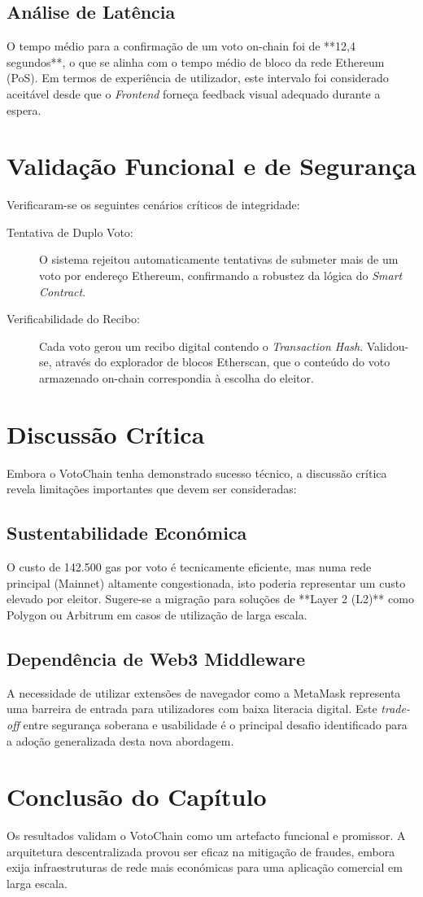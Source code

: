 \subsection{Análise de Latência}
O tempo médio para a confirmação de um voto on-chain foi de **12,4 segundos**, o que se alinha com o tempo médio de bloco da rede Ethereum (PoS). Em termos de experiência de utilizador, este intervalo foi considerado aceitável desde que o \textit{Frontend} forneça feedback visual adequado durante a espera.

\section{Validação Funcional e de Segurança}

Verificaram-se os seguintes cenários críticos de integridade:
\begin{description}
    \item[Tentativa de Duplo Voto:] O sistema rejeitou automaticamente tentativas de submeter mais de um voto por endereço Ethereum, confirmando a robustez da lógica do \textit{Smart Contract}.
    \item[Verificabilidade do Recibo:] Cada voto gerou um recibo digital contendo o \textit{Transaction Hash}. Validou-se, através do explorador de blocos Etherscan, que o conteúdo do voto armazenado on-chain correspondia à escolha do eleitor.
\end{description}

\section{Discussão Crítica}

Embora o VotoChain tenha demonstrado sucesso técnico, a discussão crítica revela limitações importantes que devem ser consideradas:

\subsection{Sustentabilidade Económica}
O custo de 142.500 gas por voto é tecnicamente eficiente, mas numa rede principal (Mainnet) altamente congestionada, isto poderia representar um custo elevado por eleitor. Sugere-se a migração para soluções de **Layer 2 (L2)** como Polygon ou Arbitrum em casos de utilização de larga escala.

\subsection{Dependência de Web3 Middleware}
A necessidade de utilizar extensões de navegador como a MetaMask representa uma barreira de entrada para utilizadores com baixa literacia digital. Este \textit{trade-off} entre segurança soberana e usabilidade é o principal desafio identificado para a adoção generalizada desta nova abordagem.

\section{Conclusão do Capítulo}
Os resultados validam o VotoChain como um artefacto funcional e promissor. A arquitetura descentralizada provou ser eficaz na mitigação de fraudes, embora exija infraestruturas de rede mais económicas para uma aplicação comercial em larga escala.
